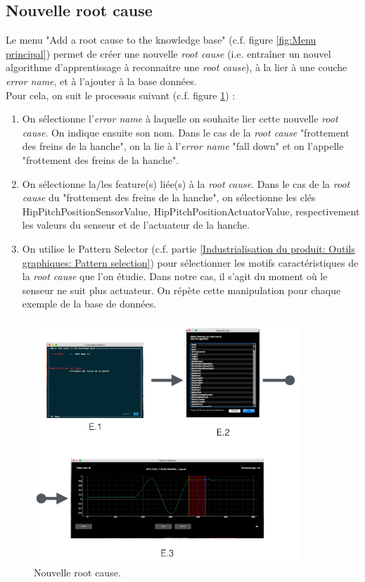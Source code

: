 \subsection{Nouvelle root cause}
\label{Industrialisation du produit: Utilisation suggérée des outils: Nouvelle root cause}
Le menu "Add a root cause to the knowledge base" (c.f. figure \ref{fig:Menu principal}) permet de créer une nouvelle \emph{root cause} (i.e. entraîner un nouvel algorithme d'apprentissage à reconnaitre une \emph{root cause}), à la lier à une couche \emph{error name}, et à l'ajouter à la base données. \\
Pour cela, on suit le processus suivant (c.f. figure \ref{fig: Nouvelle root cause}) : 
\begin{enumerate}
	\item On sélectionne l'\emph{error name} à laquelle on souhaite lier cette nouvelle \emph{root cause}. On indique ensuite son nom. Dans le cas de la \emph{root cause} "frottement des freins de la hanche", on la lie à l'\emph{error name} "fall down" et on l'appelle "frottement des freins de la hanche". 
	\item On sélectionne la/les feature(s) liée(s) à la \emph{root cause}. Dans le cas de la \emph{root cause} du "frottement des freins de la hanche", on sélectionne les clés HipPitchPositionSensorValue, HipPitchPositionActuatorValue, respectivement les valeurs du senseur et de l'actuateur de la hanche. 
	\item On utilise le Pattern Selector (c.f. partie \ref{Industrialisation du produit: Outils graphiques: Pattern selection}) pour sélectionner les motifs caractéristiques de la \emph{root cause} que l'on étudie. Dans notre cas, il s'agit du moment où le senseur ne suit plus actuateur. On répète cette manipulation pour chaque exemple de la base de données.
\end{enumerate}

\begin{figure}[H]
	\centering\includegraphics[width=10cm]{images/add_root_menu.png}
	\caption[Nouvelle root cause]{Nouvelle root cause.}
	\label{fig: Nouvelle root cause}
\end{figure} 


